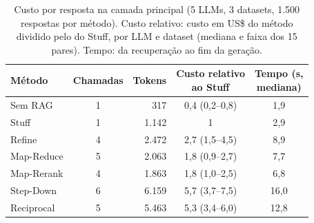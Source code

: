 \begin{table}[!t]
\centering
\footnotesize
\setlength{\tabcolsep}{3.5pt}
\caption{Custo por resposta na camada principal (5 LLMs, 3 datasets, 1.500 respostas por método). Custo relativo: custo em US\$ do método dividido pelo do Stuff, por LLM e dataset (mediana e faixa dos 15 pares). Tempo: da recuperação ao fim da geração.}
\label{tab:custo}
\begin{tabular}{lcrcc}
\toprule
Método & Chamadas & Tokens & \shortstack{Custo relativo\\ao Stuff} & \shortstack{Tempo (s,\\mediana)} \\
\midrule
Sem RAG & 1 & 317 & 0,4 (0,2--0,8) & 1,9 \\
Stuff & 1 & 1.142 & 1 & 2,9 \\
Refine & 4 & 2.472 & 2,7 (1,5--4,5) & 8,9 \\
Map-Reduce & 5 & 2.063 & 1,8 (0,9--2,7) & 7,7 \\
Map-Rerank & 4 & 1.863 & 1,8 (1,0--2,5) & 6,8 \\
Step-Down & 6 & 6.159 & 5,7 (3,7--7,5) & 16,0 \\
Reciprocal & 5 & 5.463 & 5,3 (3,4--6,0) & 12,8 \\
\bottomrule
\end{tabular}
\end{table}
